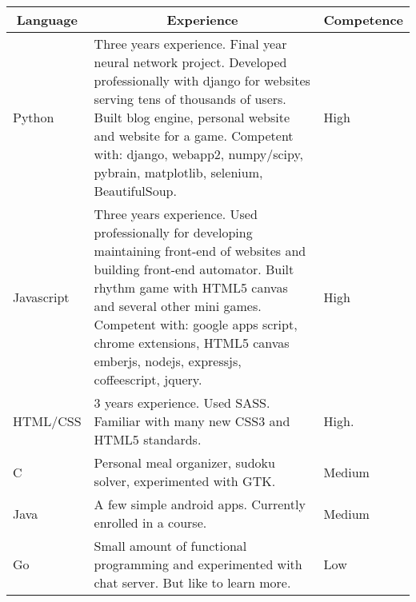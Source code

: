  \begin{minipage}[t]{\listitemmaincolumnwidth}
 \begin{tabular}{ | m{4cm} | p{5cm} | l |}
 \multicolumn{1}{c}{\bfseries Language} & \multicolumn{1}{c}{\bfseries Experience} & \multicolumn{1}{c}{\bfseries Competence} \\ \hline
 \hline Python & Three years experience. Final year neural network project. Developed professionally with django for websites serving tens of thousands of users. Built blog engine, personal website and website for a game. Competent with: django, webapp2, numpy/scipy, pybrain, matplotlib, selenium, BeautifulSoup. & High \\ 
 \hline Javascript & Three years experience. Used professionally for developing maintaining front-end of websites and building front-end automator. Built rhythm game with HTML5 canvas and several other mini games. Competent with: google apps script, chrome extensions, HTML5 canvas emberjs, nodejs, expressjs, coffeescript, jquery. & High \\ \hline HTML/CSS & 3 years experience. Used SASS. Familiar with many new CSS3 and HTML5 standards. & High. \\
 \hline C & Personal meal organizer, sudoku solver, experimented with GTK. & Medium \\
 \hline Java & A few simple android apps. Currently enrolled in a course. & Medium \\
 \hline Go & Small amount of functional programming and experimented with chat server. But like to learn more. & Low \\
\end{tabular}\end{minipage}

